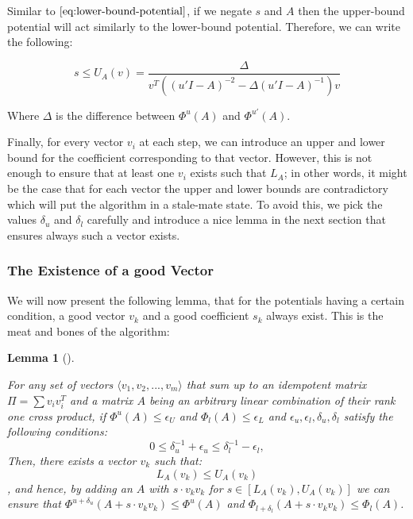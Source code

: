 \documentclass[
  letterpaper,
  DIV=11,
  numbers=noendperiod]{scrartcl}
\theoremstyle{plain}
\theoremstyle{plain}
\theoremstyle{plain}
\newtheorem{lemma}{Lemma}[section]
\theoremstyle{definition}
\theoremstyle{remark}
\begin{document}
Similar to \(\eqref{eq:lower-bound-potential}\), if we negate \(s\) and
\(A\) then the upper-bound potential will act similarly to the
lower-bound potential. Therefore, we can write the following:

\begin{equation} \tag{2}\label{eq:upper-bound-potential}
s \le U_A(v) = \frac{\Delta}{v^T \left((u' I - A)^{-2} - \Delta (u' I - A)^{-1}\right)v}
\end{equation}

Where \(\Delta\) is the difference between \(\Phi^u(A)\) and
\(\Phi^{u'}(A)\).

Finally, for every vector \(v_i\) at each step, we can introduce an
upper and lower bound for the coefficient corresponding to that vector.
However, this is not enough to ensure that at least one \(v_i\) exists
such that \(L_A\); in other words, it might be the case that for each
vector the upper and lower bounds are contradictory which will put the
algorithm in a stale-mate state. To avoid this, we pick the values
\(\delta_u\) and \(\delta_l\) carefully and introduce a nice lemma in
the next section that ensures always such a vector exists.

\hypertarget{the-existence-of-a-good-vector}{%
\subsubsection{The Existence of a good
Vector}\label{the-existence-of-a-good-vector}}

We will now present the following lemma, that for the potentials having
a certain condition, a good vector \(v_k\) and a good coefficient
\(s_k\) always exist. This is the meat and bones of the algorithm:

\leavevmode{}%
\begin{lemma}[]\label{lem-good-vector-existance}

For any set of vectors \(\langle v_1, v_2, ..., v_m \rangle\) that sum
up to an idempotent matrix \(\Pi = \sum v_i v_i^T\) and a matrix \(A\)
being an arbitrary linear combination of their rank one cross product,
if \(\Phi^u(A) \le \epsilon_U\) and \(\Phi_l(A) \le \epsilon_L\) and
\(\epsilon_u, \epsilon_l, \delta_u, \delta_l\) satisfy the following
conditions:
\[0 \le \delta_u^{-1} + \epsilon_u \le \delta_l^{-1} - \epsilon_l,\]
Then, there exists a vector \(v_k\) such that: \[L_A(v_k) \le U_A(v_k)\]
, and hence, by adding an \(A\) with \(s \cdot v_k v_k\) for
\(s \in [L_A(v_k), U_A(v_k)]\) we can ensure that
\(\Phi^{u + \delta_u}(A + s \cdot v_k v_k) \le \Phi^{u}(A)\) and
\(\Phi_{l + \delta_l}(A + s \cdot v_k v_k) \le \Phi_l(A)\).

\end{lemma}
\end{document}
